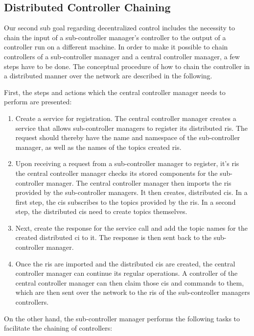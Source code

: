 \subsection{Distributed Controller Chaining}
Our second sub goal regarding decentralized control includes the necessity to chain the input of a sub-controller manager's controller to the output of a controller run on a different machine. In order to make it possible to chain controllers of a sub-controller manager and a central controller manager, a few steps have to be done. The conceptual procedure of how to chain the controller in a distributed manner over the network are described in the following.

First, the steps and actions which the central controller manager needs to perform are presented:
\begin{enumerate}
    \item Create a service for registration. The central controller manager creates a service that allows sub-controller managers to register its distributed \glspl{ri}. The request should thereby have the name and namespace of the sub-controller manager, as well as the names of the topics created \glspl{ri}.
        
    \item Upon receiving a request from a sub-controller manager to register, it's \glspl{ri} the central controller manager checks its stored components for the sub-controller manager. The central controller manager then imports the \glspl{ri} provided by the sub-controller managers. It then creates, distributed \glspl{ci}. In a first step, the \glspl{ci} subscribes to the topics provided by the \glspl{ri}. In a second step, the distributed \glspl{ci} need to create topics themselves.
    
    \item Next, create the response for the service call and add the topic names for the created distributed \gls{ci} to it. The response is then sent back to the sub-controller manager.
    
    \item  Once the \glspl{ri} are imported and the distributed \glspl{ci} are created, the central controller manager can continue its regular operations. A controller of the central controller manager can then claim those \glspl{ci} and commands to them, which are then sent over the network to the \glspl{ri} of the sub-controller managers controllers.
\end{enumerate}
On the other hand, the sub-controller manager performs the following tasks to facilitate the chaining of controllers:
